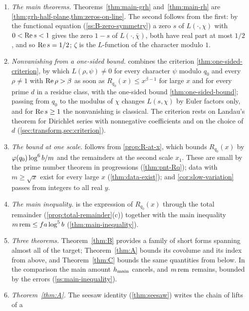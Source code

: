 \begin{enumerate}[label=\textup{(S\arabic*)},leftmargin=2.6em]
\item\label{it:chain-main} \emph{The main theorems.} Theorems~\ref{thm:main-grh} and~\ref{thm:main-rh}
are \cref{thm:grh-half-plane,thm:zeros-on-line}. The second follows from the first: by the functional
equation (\cref{ss:B-zero-symmetry}) a zero $s$ of $L(\cdot,\chi)$ with $0<\operatorname{Re} s<1$ gives the zero
$1-s$ of $L(\cdot,\bar\chi)$, both have real part at most $1/2$, and so $\operatorname{Re} s=1/2$; $\zeta$ is the
$L$-function of the character modulo $1$.
\item \emph{Nonvanishing from a one-sided bound.}  combines the criterion
\cref{thm:one-sided-criterion}, by which $L(\rho,\psi)\ne0$ for every character $\psi$ modulo $q_0$
and every $\rho\ne1$ with $\operatorname{Re}\rho>\beta$ as soon as $R_{q_0}(x)\le x^{\beta-1}$ for large $x$ and for
every prime $d$ in a residue class, with the one-sided bound \cref{thm:one-sided-bound}; passing from
$q_0$ to the modulus of $\chi$ changes $L(s,\chi)$ by Euler factors only, and for $\operatorname{Re} s\ge1$ the
nonvanishing is classical. The criterion rests on
Landau's theorem for Dirichlet series with nonnegative coefficients and on the choice of $d$
(\cref{sec:transform,sec:criterion}).
\item \emph{The bound at one scale.}  follows from \cref{prop:R-at-x}, which
bounds $R_{q_0}(x)$ by $\varphi(q_0)\log^6b/m$ and the remainders at the second scale $x_1$. These
are small by the prime number theorem in progressions (\cref{thm:pnt-Rq}); data with $m\ge\sqrt x$
exist for every large $x$ (\cref{thm:data-exist}); and \cref{cor:slow-variation} passes from integers
to all real $y$.
\item \emph{The main inequality.}  is the expression of $R_{q_0}(x)$ through the total
remainder (\cref{prop:total-remainder}(c)) together with the main inequality
$m\,\mathrm{rem}\le fa\log^5b$ (\cref{thm:main-inequality}).
\item \emph{Three theorems.} Theorem~\ref{thm:B} provides a family of short forms spanning almost all
of the target; Theorem~\ref{thm:A} bounds its covolume and its index from above, and
Theorem~\ref{thm:C} bounds the same quantities from below. In the comparison the main amount $h_{\mathrm{main}}$
cancels, and $m\,\mathrm{rem}$ remains, bounded by the errors (\cref{ss:main-inequality}).
\item \emph{Theorem~\ref{thm:A}.} The seesaw identity (\cref{thm:seesaw}) writes the chain of lifts of a

\end{enumerate}
